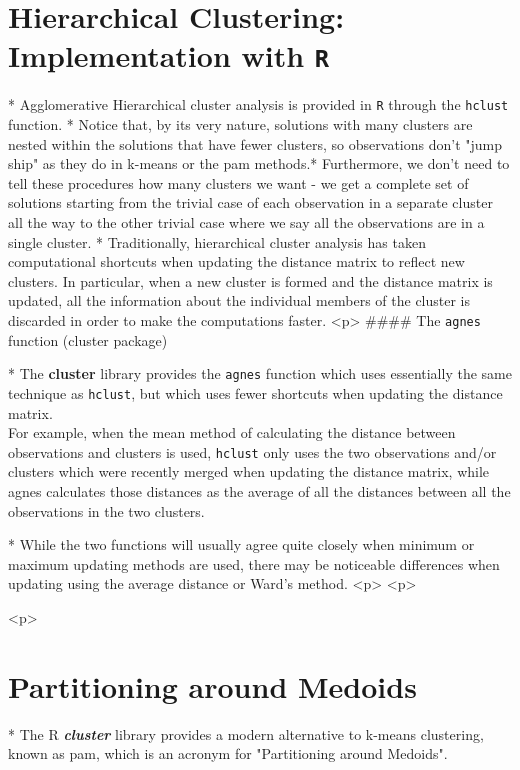 \section{Hierarchical Clustering: Implementation with \texttt{R}}

*  Agglomerative Hierarchical cluster analysis is provided in \texttt{R} through the \texttt{hclust} function.
*  Notice that, by its very nature, solutions with many clusters are nested within the solutions that have fewer clusters, so observations don't "jump ship" as they do in k-means or the pam methods.* Furthermore, we don't need to tell these procedures how many clusters we want - we get a complete set of solutions starting from the trivial case of each observation in a separate cluster all the way to the other trivial case where we say all the observations are in a single cluster.
*  Traditionally, hierarchical cluster analysis has taken computational shortcuts when updating the distance matrix to reflect new clusters. In particular, when a new cluster is formed and the distance matrix is updated, all the information about the individual members of the cluster is discarded in order to make the computations faster. 
<p>
#### {The \texttt{agnes} function (cluster package)}

*  The \textbf{cluster} library provides the \texttt{agnes} function which uses essentially the same technique as \texttt{hclust}, but which uses fewer shortcuts when updating the distance matrix.\\ For example, when the mean method of calculating the distance between observations and clusters is used, \texttt{hclust} only uses the two observations and/or clusters which were recently merged when updating the distance matrix, while agnes calculates those distances as the average of all the distances between all the observations in the two clusters. 

*  While the two functions will usually agree quite closely when minimum or maximum updating methods are used, there may be noticeable differences when updating using the average distance or Ward's method.
<p>
<p>

<p>
\section{Partitioning around Medoids}

*  The R \textbf{\textit{cluster}} library provides a modern alternative to k-means clustering, known as pam, which is an acronym for "Partitioning around Medoids". 

